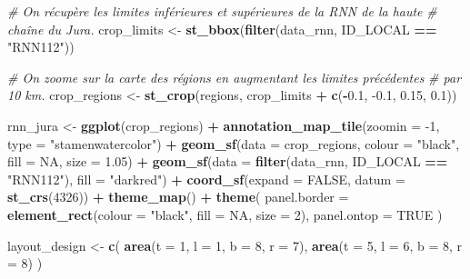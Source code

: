 \documentclass[
  french,
]{book}
\newenvironment{Shaded}{\begin{snugshade}}{\end{snugshade}}
\newcommand{\CommentTok}[1]{\textcolor[rgb]{0.56,0.35,0.01}{\textit{#1}}}
\newcommand{\DataTypeTok}[1]{\textcolor[rgb]{0.13,0.29,0.53}{#1}}
\newcommand{\DecValTok}[1]{\textcolor[rgb]{0.00,0.00,0.81}{#1}}
\newcommand{\FloatTok}[1]{\textcolor[rgb]{0.00,0.00,0.81}{#1}}
\newcommand{\KeywordTok}[1]{\textcolor[rgb]{0.13,0.29,0.53}{\textbf{#1}}}
\newcommand{\NormalTok}[1]{#1}
\newcommand{\OperatorTok}[1]{\textcolor[rgb]{0.81,0.36,0.00}{\textbf{#1}}}
\newcommand{\OtherTok}[1]{\textcolor[rgb]{0.56,0.35,0.01}{#1}}
\newcommand{\StringTok}[1]{\textcolor[rgb]{0.31,0.60,0.02}{#1}}
\begin{document}
\begin{Shaded}
\begin{Highlighting}[]
\CommentTok{\# On récupère les limites inférieures et supérieures de la RNN de la haute}
\CommentTok{\# chaîne du Jura.}
\NormalTok{crop\_limits \textless{}{-}}\StringTok{ }\KeywordTok{st\_bbox}\NormalTok{(}\KeywordTok{filter}\NormalTok{(data\_rnn, ID\_LOCAL }\OperatorTok{==}\StringTok{ "RNN112"}\NormalTok{))}

\CommentTok{\# On zoome sur la carte des régions en augmentant les limites précédentes}
\CommentTok{\# par 10 km.}
\NormalTok{crop\_regions \textless{}{-}}\StringTok{ }\KeywordTok{st\_crop}\NormalTok{(regions, crop\_limits }\OperatorTok{+}\StringTok{ }\KeywordTok{c}\NormalTok{(}\OperatorTok{{-}}\FloatTok{0.1}\NormalTok{, }\FloatTok{{-}0.1}\NormalTok{, }\FloatTok{0.15}\NormalTok{, }\FloatTok{0.1}\NormalTok{))}

\NormalTok{rnn\_jura \textless{}{-}}\StringTok{ }\KeywordTok{ggplot}\NormalTok{(crop\_regions) }\OperatorTok{+}
\StringTok{  }\KeywordTok{annotation\_map\_tile}\NormalTok{(}\DataTypeTok{zoomin =} \DecValTok{{-}1}\NormalTok{, }\DataTypeTok{type =} \StringTok{"stamenwatercolor"}\NormalTok{) }\OperatorTok{+}
\StringTok{  }\KeywordTok{geom\_sf}\NormalTok{(}\DataTypeTok{data =}\NormalTok{ crop\_regions, }\DataTypeTok{colour =} \StringTok{"black"}\NormalTok{, }\DataTypeTok{fill =} \OtherTok{NA}\NormalTok{, }\DataTypeTok{size =} \FloatTok{1.05}\NormalTok{) }\OperatorTok{+}
\StringTok{  }\KeywordTok{geom\_sf}\NormalTok{(}\DataTypeTok{data =} \KeywordTok{filter}\NormalTok{(data\_rnn, ID\_LOCAL }\OperatorTok{==}\StringTok{ "RNN112"}\NormalTok{), }\DataTypeTok{fill =} \StringTok{"darkred"}\NormalTok{) }\OperatorTok{+}
\StringTok{  }\KeywordTok{coord\_sf}\NormalTok{(}\DataTypeTok{expand =} \OtherTok{FALSE}\NormalTok{, }\DataTypeTok{datum =} \KeywordTok{st\_crs}\NormalTok{(}\DecValTok{4326}\NormalTok{)) }\OperatorTok{+}
\StringTok{  }\KeywordTok{theme\_map}\NormalTok{() }\OperatorTok{+}
\StringTok{  }\KeywordTok{theme}\NormalTok{(}
    \DataTypeTok{panel.border =} \KeywordTok{element\_rect}\NormalTok{(}\DataTypeTok{colour =} \StringTok{"black"}\NormalTok{, }\DataTypeTok{fill =} \OtherTok{NA}\NormalTok{, }\DataTypeTok{size =} \DecValTok{2}\NormalTok{),}
    \DataTypeTok{panel.ontop =} \OtherTok{TRUE}
\NormalTok{  )}

\NormalTok{layout\_design \textless{}{-}}\StringTok{ }\KeywordTok{c}\NormalTok{(}
  \KeywordTok{area}\NormalTok{(}\DataTypeTok{t =} \DecValTok{1}\NormalTok{, }\DataTypeTok{l =} \DecValTok{1}\NormalTok{, }\DataTypeTok{b =} \DecValTok{8}\NormalTok{, }\DataTypeTok{r =} \DecValTok{7}\NormalTok{),}
  \KeywordTok{area}\NormalTok{(}\DataTypeTok{t =} \DecValTok{5}\NormalTok{, }\DataTypeTok{l =} \DecValTok{6}\NormalTok{, }\DataTypeTok{b =} \DecValTok{8}\NormalTok{, }\DataTypeTok{r =} \DecValTok{8}\NormalTok{)}
\NormalTok{)}


\end{Highlighting}
\end{Shaded}
\end{document}
